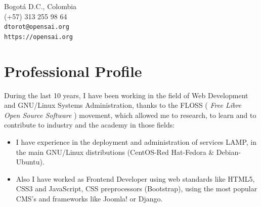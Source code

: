 \documentclass[overlapped,line,final]{res}
\begin{document}

\begin{resume}


\begin{minipage}{\linewidth}
	\begin{minipage}{0.5\linewidth} %
    		Bogotá D.C., Colombia \\ %
    		(+57) 313 255 98 64 \\ %
    		{\tt dtorot@opensai.org} \\ %
     	{\tt https://opensai.org} \\ %
	\end{minipage}
	\begin{minipage}{0.5\linewidth}
		\begin{center}
		\end{center}
	\end{minipage}
\end{minipage}


\vspace{0.5cm}
\section{\sc Professional Profile}
\vspace{0.5cm}
During the last 10 years, I have been working in the field of Web Development and GNU/Linux Systems Administration, thanks to the FLOSS ( {\em Free Libre Open Source Software } ) movement, which allowed me to research, to learn and to contribute to industry and the academy in those fields:

\vspace{2mm}
\begin{itemize}
    \item I have experience in the deployment and administration of services LAMP, in the main GNU/Linux distributions (CentOS-Red Hat-Fedora \& Debian-Ubuntu). 

    \item Also I have worked as Frontend Developer using web standards like HTML5, CSS3 and JavaScript, CSS preprocessors (Bootstrap), using the most popular CMS's and frameworks like Joomla! or Django.


\end{itemize}
\end{resume}
\end{document}
